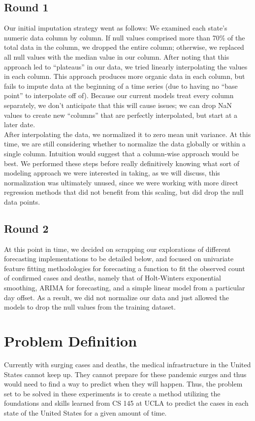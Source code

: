 \documentclass[sigconf,nonacm]{acmart}
\begin{document}
\subsection{Round 1}
Our initial imputation strategy went as follows: 
We examined each state’s numeric data column by column. If null values comprised more than 70\% of the total data in the column, 
we dropped the entire column; otherwise, we replaced all null values with the median value in our column. 
After noting that this approach led to “plateaus” in our data, we tried linearly interpolating the values in each column. 
This approach produces more organic data in each column, but fails to impute data at the beginning of a time series 
(due to having no “base point” to interpolate off of). Because our current models treat every column separately, 
we don’t anticipate that this will cause issues; we can drop NaN values to create new “columns” that are perfectly interpolated, but start at a later date.  
\\
After interpolating the data, we normalized it to zero mean unit variance. 
At this time, we are still considering whether to normalize the data globally or within a single column. 
Intuition would suggest that a column-wise approach would be best. We performed these steps before really definitively knowing 
what sort of modeling approach we were interested in taking, as we will discuss, this normalization was ultimately unused, 
since we were working with more direct regression methods that did not benefit from this scaling, but did drop the null data points.

\subsection{Round 2}
At this point in time, we decided on scrapping our explorations of different forecasting implementations to be detailed below, 
and focused on univariate feature fitting methodologies for forecasting a function to fit the observed count of confirmed cases and deaths, 
namely that of Holt-Winters exponential smoothing, ARIMA for forecasting, and a simple linear model from a particular day offset. 
As a result, we did not normalize our data and just allowed the models to drop the null values from the training dataset.
\section{Problem Definition}
Currently with surging cases and deaths, the medical infrastructure in the United States cannot keep up. They cannot prepare for these pandemic surges and thus would need to find a way to predict when they will happen. Thus, the problem set to be solved in these experiments is to create a method utilizing the foundations and skills learned from CS 145 at UCLA to predict the cases in each state of the United States for a given amount of time. 
\end{document}

